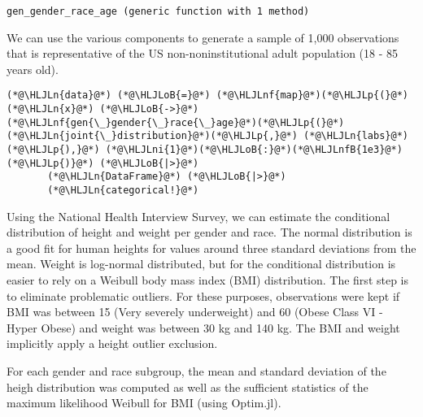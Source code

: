 \documentclass[12pt,a4paper]{article}
\newcommand{\HLJLn}[1]{#1}
\newcommand{\HLJLnf}[1]{\textcolor[RGB]{66,102,213}{#1}}
\newcommand{\HLJLnfB}[1]{\textcolor[RGB]{59,151,46}{#1}}
\newcommand{\HLJLni}[1]{\textcolor[RGB]{59,151,46}{#1}}
\newcommand{\HLJLoB}[1]{\textcolor[RGB]{102,102,102}{\textbf{#1}}}
\newcommand{\HLJLp}[1]{#1}
\begin{document}
\begin{lstlisting}
gen_gender_race_age (generic function with 1 method)
\end{lstlisting}


We can use the various components to generate a sample of 1,000 observations that is representative of the US non-noninstitutional adult population (18 - 85 years old).


\begin{lstlisting}
(*@\HLJLn{data}@*) (*@\HLJLoB{=}@*) (*@\HLJLnf{map}@*)(*@\HLJLp{(}@*)(*@\HLJLn{x}@*) (*@\HLJLoB{->}@*) (*@\HLJLnf{gen{\_}gender{\_}race{\_}age}@*)(*@\HLJLp{(}@*)(*@\HLJLn{joint{\_}distribution}@*)(*@\HLJLp{,}@*) (*@\HLJLn{labs}@*)(*@\HLJLp{),}@*) (*@\HLJLni{1}@*)(*@\HLJLoB{:}@*)(*@\HLJLnfB{1e3}@*)(*@\HLJLp{)}@*) (*@\HLJLoB{|>}@*)
       (*@\HLJLn{DataFrame}@*) (*@\HLJLoB{|>}@*)
       (*@\HLJLn{categorical!}@*)
\end{lstlisting}


Using the National Health Interview Survey, we can estimate the conditional distribution of height and weight per gender and race. The normal distribution is a good fit for human heights for values around three standard deviations from the mean. Weight is log-normal distributed, but for the conditional distribution is easier to rely on a Weibull body mass index (BMI) distribution. The first step is to eliminate problematic outliers. For these purposes, observations were kept if BMI was between 15 (Very severely underweight) and 60 (Obese Class VI - Hyper Obese) and weight was between 30 kg and 140 kg. The BMI and weight implicitly apply a height outlier exclusion.

For each gender and race subgroup, the mean and standard deviation of the heigh distribution was computed as well as the sufficient statistics of the maximum likelihood Weibull for BMI (using Optim.jl).
\end{document}
